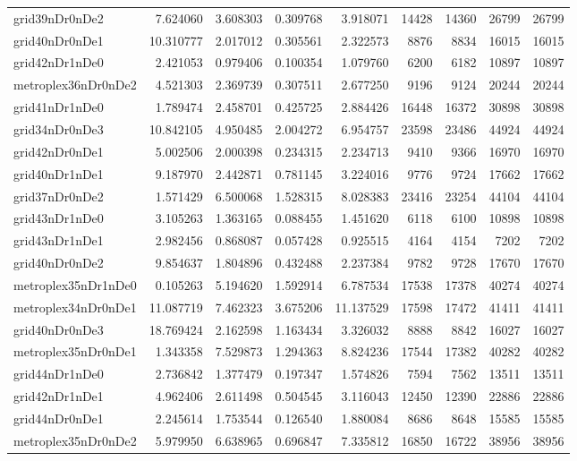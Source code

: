 \begin{longtable}{|l|r|r|r|r|r|r|r|r|}
grid39nDr0nDe2 & 7.624060 & 3.608303 & 0.309768 & 3.918071 & 14428 & 14360 & 26799 & 26799 \\
grid40nDr0nDe1 & 10.310777 & 2.017012 & 0.305561 & 2.322573 & 8876 & 8834 & 16015 & 16015 \\
grid42nDr1nDe0 & 2.421053 & 0.979406 & 0.100354 & 1.079760 & 6200 & 6182 & 10897 & 10897 \\
metroplex36nDr0nDe2 & 4.521303 & 2.369739 & 0.307511 & 2.677250 & 9196 & 9124 & 20244 & 20244 \\
grid41nDr1nDe0 & 1.789474 & 2.458701 & 0.425725 & 2.884426 & 16448 & 16372 & 30898 & 30898 \\
grid34nDr0nDe3 & 10.842105 & 4.950485 & 2.004272 & 6.954757 & 23598 & 23486 & 44924 & 44924 \\
grid42nDr0nDe1 & 5.002506 & 2.000398 & 0.234315 & 2.234713 & 9410 & 9366 & 16970 & 16970 \\
grid40nDr1nDe1 & 9.187970 & 2.442871 & 0.781145 & 3.224016 & 9776 & 9724 & 17662 & 17662 \\
grid37nDr0nDe2 & 1.571429 & 6.500068 & 1.528315 & 8.028383 & 23416 & 23254 & 44104 & 44104 \\
grid43nDr1nDe0 & 3.105263 & 1.363165 & 0.088455 & 1.451620 & 6118 & 6100 & 10898 & 10898 \\
grid43nDr1nDe1 & 2.982456 & 0.868087 & 0.057428 & 0.925515 & 4164 & 4154 & 7202 & 7202 \\
grid40nDr0nDe2 & 9.854637 & 1.804896 & 0.432488 & 2.237384 & 9782 & 9728 & 17670 & 17670 \\
metroplex35nDr1nDe0 & 0.105263 & 5.194620 & 1.592914 & 6.787534 & 17538 & 17378 & 40274 & 40274 \\
metroplex34nDr0nDe1 & 11.087719 & 7.462323 & 3.675206 & 11.137529 & 17598 & 17472 & 41411 & 41411 \\
grid40nDr0nDe3 & 18.769424 & 2.162598 & 1.163434 & 3.326032 & 8888 & 8842 & 16027 & 16027 \\
metroplex35nDr0nDe1 & 1.343358 & 7.529873 & 1.294363 & 8.824236 & 17544 & 17382 & 40282 & 40282 \\
grid44nDr1nDe0 & 2.736842 & 1.377479 & 0.197347 & 1.574826 & 7594 & 7562 & 13511 & 13511 \\
grid42nDr1nDe1 & 4.962406 & 2.611498 & 0.504545 & 3.116043 & 12450 & 12390 & 22886 & 22886 \\
grid44nDr0nDe1 & 2.245614 & 1.753544 & 0.126540 & 1.880084 & 8686 & 8648 & 15585 & 15585 \\
metroplex35nDr0nDe2 & 5.979950 & 6.638965 & 0.696847 & 7.335812 & 16850 & 16722 & 38956 & 38956 \\

\end{longtable}

